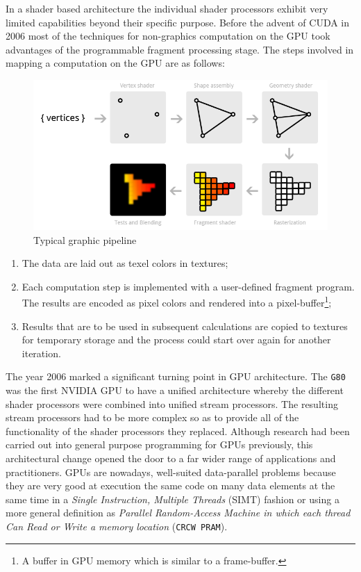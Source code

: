     In a shader based architecture the individual shader processors exhibit very limited capabilities beyond their specific purpose.
    Before the advent of CUDA in 2006 most of the techniques for non-graphics
    computation on the GPU took advantages of the programmable fragment processing stage. The steps involved in mapping a computation on the GPU are
    as follows:
    \begin{figure}
    	\centering
    	\caption{Typical graphic pipeline}\label{graphicPipeline}
    	\includegraphics[width=1.0\textwidth]{./images/parallel_programming/pipeline}
    \end{figure}
    
    \begin{enumerate}
    	\item The data are laid out as texel colors in textures;
    	\item  Each computation step is implemented with a
    	user-defined fragment program. The results are encoded as pixel 
    	colors and rendered into a pixel-buffer\footnote{ A buffer in GPU memory
    		which is similar to a frame-buffer.}; 
    	\item Results that are
    	to be used in subsequent calculations are copied to textures for temporary storage and the process could start over again for another iteration.
    \end{enumerate} 
    
    The year 2006 marked a significant turning point in GPU architecture. The \texttt{G80}  was the first NVIDIA GPU to have a unified architecture whereby the different shader processors were  combined into unified stream processors. The resulting stream processors had to be more complex so as to provide all of the functionality of the shader processors they replaced. Although research had been carried out into general purpose programming
    for GPUs previously, this architectural change opened the door to a far wider range of  applications and practitioners.    
    GPUs are nowadays, well-suited data-parallel problems because they are very good at execution the same code on many data elements at the same time  in a \textit{Single Instruction, Multiple Threads} (SIMT) fashion or using a more general definition as \textit{Parallel Random-Access Machine in which each thread Can Read or Write a memory location} (\texttt{CRCW PRAM}).
    
